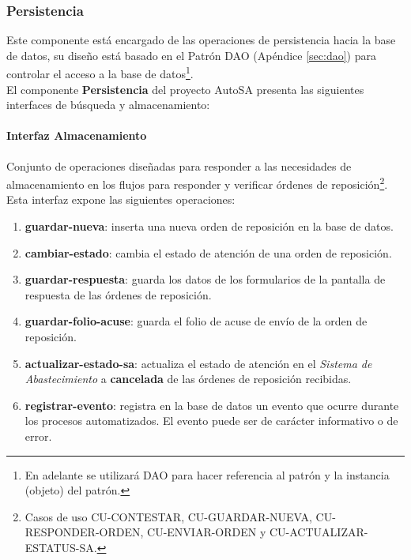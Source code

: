 \subsubsection{Persistencia}
Este componente está encargado de las operaciones de persistencia hacia la base de datos, su diseño está basado en el Patrón DAO (Apéndice \ref{sec:dao}) para controlar el acceso a la base de datos\footnote{En adelante se utilizará DAO para hacer referencia al patrón y la instancia (objeto) del patrón.}.\\
El componente \textbf{Persistencia} del proyecto AutoSA presenta las siguientes interfaces de búsqueda y almacenamiento:
\paragraph{\indent Interfaz Almacenamiento\\}
Conjunto de operaciones diseñadas para responder a las necesidades de almacenamiento en los flujos para responder y verificar órdenes de reposición\footnote{Casos de uso CU-CONTESTAR, CU-GUARDAR-NUEVA, CU-RESPONDER-ORDEN, CU-ENVIAR-ORDEN y CU-ACTUALIZAR-ESTATUS-SA.}. Esta interfaz expone las siguientes operaciones:
\begin{enumerate}
	\item \textbf{guardar-nueva}: inserta una nueva orden de reposición en la base de datos.
	\item \textbf{cambiar-estado}: cambia el estado de atención de una orden de reposición.
	\item \textbf{guardar-respuesta}: guarda los datos de los formularios de la pantalla de respuesta de las órdenes de reposición.
	\item \textbf{guardar-folio-acuse}: guarda el folio de acuse de envío de la orden de reposición.
	\item \textbf{actualizar-estado-sa}: actualiza el estado de atención en el \textit{Sistema de Abastecimiento} a \textbf{cancelada} de las órdenes de reposición recibidas.
	\item \textbf{registrar-evento}: registra en la base de datos un evento que ocurre durante los procesos automatizados. El evento puede ser de carácter informativo o de error.
\end{enumerate}
